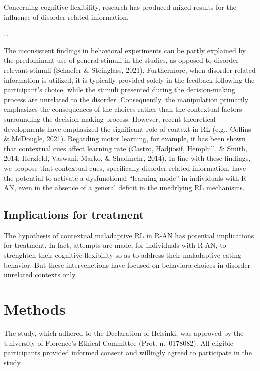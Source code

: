 \documentclass[
  man,floatsintext]{apa6}
\begin{document}
Concerning cognitive flexibility, research has produced mixed results for the influence of disorder-related information.

\ldots{}

The inconsistent findings in behavioral experiments can be partly explained by the predominant use of general stimuli in the studies, as opposed to disorder-relevant stimuli (Schaefer \& Steinglass, 2021). Furthermore, when disorder-related information is utilized, it is typically provided solely in the feedback following the participant's choice, while the stimuli presented during the decision-making process are unrelated to the disorder. Consequently, the manipulation primarily emphasizes the consequences of the choices rather than the contextual factors surrounding the decision-making process. However, recent theoretical developments have emphasized the significant role of context in RL (e.g., Collins \& McDougle, 2021). Regarding motor learning, for example, it has been shown that contextual cues affect learning rate (Castro, Hadjiosif, Hemphill, \& Smith, 2014; Herzfeld, Vaswani, Marko, \& Shadmehr, 2014). In line with these findings, we propose that contextual cues, specifically disorder-related information, have the potential to activate a dysfunctional ``learning mode'' in individuals with R-AN, even in the absence of a general deficit in the unedrlying RL mechanisms.

\hypertarget{implications-for-treatment}{%
\subsection{Implications for treatment}\label{implications-for-treatment}}

The hypothesis of contextual maladaptive RL in R-AN has potential implications for treatment. In fact, attempts are made, for individuals with R-AN, to strenghten their cognitive flexibility so as to address their maladaptive eating behavior. But these intervenctions have focused on behaviora choices in disorder-unrelated contexts only.

\hypertarget{methods}{%
\section{Methods}\label{methods}}

The study, which adhered to the Declaration of Helsinki, was approved by the University of Florence's Ethical Committee (Prot. n.~0178082). All eligible participants provided informed consent and willingly agreed to participate in the study.
\end{document}
